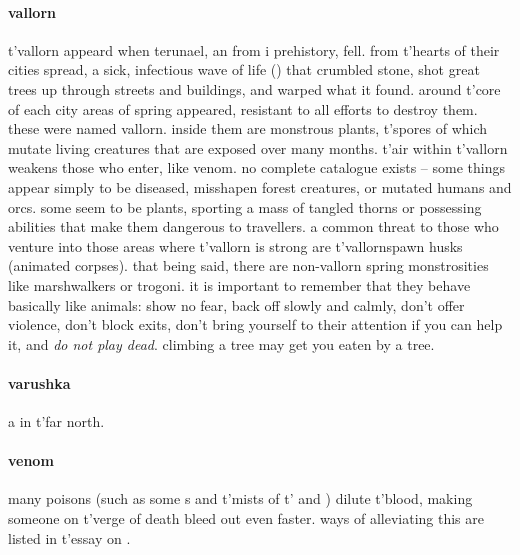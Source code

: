 \paragraph{vallorn} t'\allowbreak vallorn appeard when terunael, an  from i prehistory, fell. from t'\allowbreak hearts of their cities spread, a sick, infectious wave of life () that crumbled stone, shot great trees up through streets and buildings, and warped what it found. around t'\allowbreak core of each city areas of spring appeared, resistant to all efforts to destroy them. these were named vallorn. inside them are monstrous plants, t'\allowbreak spores of which mutate living creatures that are exposed over many months. t'\allowbreak air within t'\allowbreak vallorn weakens those who enter, like venom. no complete catalogue exists – some things appear simply to be diseased, misshapen forest creatures, or mutated humans and orcs. some seem to be plants, sporting a mass of tangled thorns or possessing abilities that make them dangerous to travellers. a common threat to those who venture into those areas where t'\allowbreak vallorn is strong are t'\allowbreak vallornspawn husks (animated corpses). that being said, there are non-vallorn spring monstrosities like marshwalkers or trogoni. it is important to remember that they behave basically like animals: show no fear, back off slowly and calmly, don't offer violence, don't block exits, don't bring yourself to their attention if you can help it, and \emph{do not play dead}. climbing a tree may get you eaten by a tree.
\paragraph{varushka} a  in t'\allowbreak far north.
\paragraph{venom} many poisons (such as some s and t'\allowbreak mists of t'\allowbreak {} and ) dilute t'\allowbreak blood, making someone on t'\allowbreak verge of death bleed out even faster. ways of alleviating this are listed in t'\allowbreak essay on .
